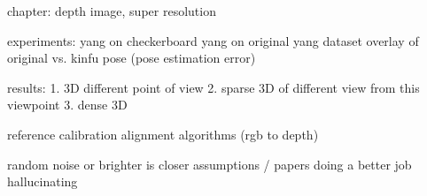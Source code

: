 chapter: depth image, super resolution 


experiments:
    yang on checkerboard
    yang on original yang dataset
    overlay of original vs. kinfu pose (pose estimation error)
    
    
results:
1. 3D different point of view
2. sparse 3D of different view from this viewpoint
3. dense 3D

    
reference calibration alignment algorithms (rgb to depth)

random noise or brighter is closer assumptions / papers doing a better job hallucinating

%